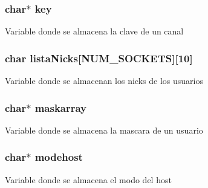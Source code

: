\subsubsection[{key}]{\setlength{\rightskip}{0pt plus 5cm}char$\ast$ key}\label{_g-2361-06-_p1-_server_8c_a5892a9181e6a332f84d27aecd41dcd12}
Variable donde se almacena la clave de un canal \hypertarget{_g-2361-06-_p1-_server_8c_a713172366a6be2fbf8456a4b43702603}{}
\subsubsection[{lista\+Nicks}]{\setlength{\rightskip}{0pt plus 5cm}char lista\+Nicks\mbox{[}{\bf N\+U\+M\+\_\+\+S\+O\+C\+K\+E\+T\+S}\mbox{]}\mbox{[}10\mbox{]}}\label{_g-2361-06-_p1-_server_8c_a713172366a6be2fbf8456a4b43702603}
Variable donde se almacenan los nicks de los usuarios \hypertarget{_g-2361-06-_p1-_server_8c_ad51a4303b7c769561b12bf04a68bc042}{}
\subsubsection[{maskarray}]{\setlength{\rightskip}{0pt plus 5cm}char$\ast$ maskarray}\label{_g-2361-06-_p1-_server_8c_ad51a4303b7c769561b12bf04a68bc042}
Variable donde se almacena la mascara de un usuario \hypertarget{_g-2361-06-_p1-_server_8c_a4f28f55d19ac069eabc38c224c3a4225}{}
\subsubsection[{modehost}]{\setlength{\rightskip}{0pt plus 5cm}char$\ast$ modehost}\label{_g-2361-06-_p1-_server_8c_a4f28f55d19ac069eabc38c224c3a4225}
Variable donde se almacena el modo del host \hypertarget{_g-2361-06-_p1-_server_8c_a7451f0d59207b53af6178219fcf62677}{}

